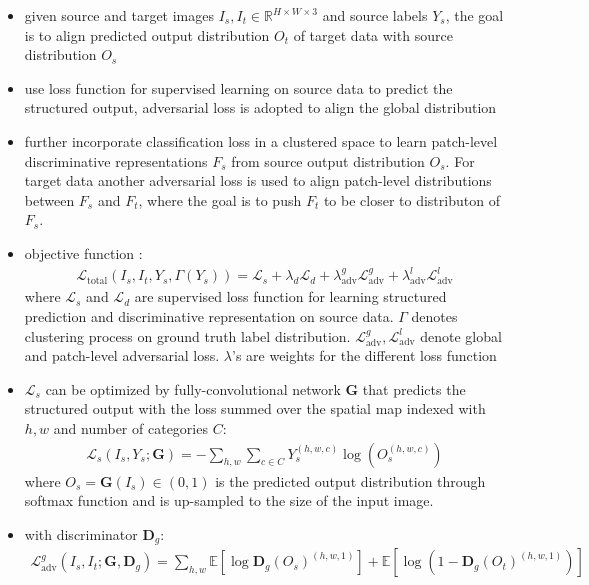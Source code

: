 \documentclass[]{article}
\begin{document}
\begin{itemize}
	\item given source and target images $I_s,I_t \in \mathbb{R}^{H \times W \times 3}$ and source labels $Y_s$, the goal is to align predicted output distribution $O_t$ of target data with source distribution $O_s$
	\item use loss function for supervised learning on source data to predict the structured output, adversarial loss is adopted to align the global distribution
	\item further incorporate classification loss in a clustered space to learn patch-level discriminative representations $F_s$ from source output distribution $O_s$. For target data another adversarial loss is used to align patch-level distributions between $F_s$ and $F_t$, where the goal is to push $F_t$ to be closer to distributon of $F_s$.
	\item objective function :
	\begin{align}
		\mathcal{L}_{\text{total}}(I_s, I_t, Y_s, \Gamma(Y_s)) = \mathcal{L}_s + \lambda_d \mathcal{L}_d + \lambda_{\text{adv}}^g \mathcal{L}_{\text{adv}}^g + \lambda_{\text{adv}}^l  \mathcal{L}_{\text{adv}}^l
	\end{align}
	where $\mathcal{L}_s$ and $\mathcal{L}_d$ are supervised loss function for learning structured prediction and discriminative representation on source data. $\Gamma$ denotes clustering process on ground truth label distribution. $\mathcal{L}_{\text{adv}}^g, \mathcal{L}_{\text{adv}}^l$ denote global and patch-level adversarial loss. $\lambda$'s are weights for the different loss function
	\item $\mathcal{L}_s$ can be optimized by fully-convolutional network $\mathbf{G}$ that predicts the structured output with the loss summed over the spatial map indexed with $h,w$ and number of categories $C$:
	\begin{align}
		\mathcal{L}_s(I_s, Y_s;\mathbf{G}) = - \sum_{h,w}\sum_{c \in C} Y_s^{(h,w,c)}\log(O_s^{(h,w,c)})
	\end{align}
	where $O_s = \mathbf{G}(I_s) \in (0,1)$ is the predicted output distribution through softmax function and is up-sampled to the size of the input image.
	\item with discriminator $\mathbf{D}_g$:
	\begin{align}
		\mathcal{L}_{\text{adv}}^g(I_s, I_t; \mathbf{G}, \mathbf{D}_g) = \sum_{h,w}\mathbb{E}[\log\mathbf{D}_g(O_s)^{(h,w,1)}] + \mathbb{E}[\log(1- \mathbf{D}_g(O_t)^{(h,w,1)})]
	\end{align}

\end{itemize}
\end{document}
